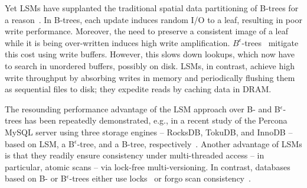 \documentclass[sigplan,10pt]{acmart}
\newcommand{\remove}[1]{}
\begin{document}
Yet  LSMs have supplanted the  traditional spatial data partitioning of B-trees for a reason~\cite{rocks-vs-inno}.
In  B-trees, each update induces random I/O  to a leaf, resulting in poor write performance.
Moreover, the need to preserve a consistent image of a leaf while it is being over-written induces high write amplification. 
$B^{\epsilon}$-trees~\cite{Brodal:2003:LBE:644108.644201} mitigate this cost using write buffers. %
However, this slows down lookups, which now have to search in unordered buffers, possibly on disk. 
%
LSMs, in contrast, achieve high write throughput by absorbing  writes in memory and periodically flushing them as 
sequential files to disk; they expedite reads by caching data in DRAM.

The resounding performance advantage of the LSM approach over B- and B$^{\epsilon}$-trees has been repeatedly demonstrated, 
e.g., in a recent  study of the Percona MySQL server using three storage engines -- RocksDB, TokuDB, and InnoDB --
based on LSM, a B$^{\epsilon}$-tree, and a B-tree, respectively~\cite{toku-rocks-inno}.
%
Another advantage of LSMs is that they readily ensure consistency under multi-threaded access -- in particular, atomic scans --   
via lock-free multi-versioning.
In contrast, databases based on B- or  B$^\epsilon$-trees either use locks~\cite{innodblocking} 
or forgo scan consistency~\cite{tucana}.



\remove{
Obviously, we do not claim that spatial data partitioning is new; indeed, classical B-trees~\cite{DBLP:conf/sigmod/BayerM70,Comer79} 
 pre-date  LSM trees, and many B-tree variants~\cite{Brodal:2003:LBE:644108.644201,Bender15, Lehman:1981:ELC:319628.319663} have  emerged over the years. 
 However, it is important to note that these trees are  conceptual constructs rather than storage systems; 
 employing these concepts within a practical data store over a memory hierarchy 
 raises multiple challenges,  which perhaps explains their limited adoption in industrial KV-stores.
 A key challenge is what to persist when and in what format. 
 }
\end{document}

